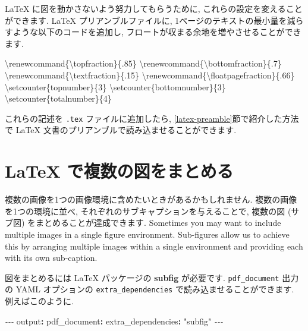 \documentclass[
  11pt,
]{bxjsreport}
\newenvironment{Shaded}{\begin{snugshade}}{\end{snugshade}}
\newcommand{\AttributeTok}[1]{\textcolor[rgb]{0.77,0.63,0.00}{#1}}
\newcommand{\ExtensionTok}[1]{#1}
\newcommand{\FunctionTok}[1]{\textcolor[rgb]{0.00,0.00,0.00}{#1}}
\newcommand{\KeywordTok}[1]{\textcolor[rgb]{0.13,0.29,0.53}{\textbf{#1}}}
\newcommand{\NormalTok}[1]{#1}
\newcommand{\PreprocessorTok}[1]{\textcolor[rgb]{0.56,0.35,0.01}{\textit{#1}}}
\newcommand{\StringTok}[1]{\textcolor[rgb]{0.31,0.60,0.02}{#1}}
\begin{document}
LaTeX に図を動かさないよう努力してもらうために, これらの設定を変えることができます. LaTeX プリアンブルファイルに, 1ページのテキストの最小量を減らすような以下のコードを追加し, フロートが収まる余地を増やさせることができます.

\begin{Shaded}
\begin{Highlighting}[]
\FunctionTok{\textbackslash{}renewcommand}\NormalTok{\{}\ExtensionTok{\textbackslash{}topfraction}\NormalTok{\}\{.85\}}
\FunctionTok{\textbackslash{}renewcommand}\NormalTok{\{}\ExtensionTok{\textbackslash{}bottomfraction}\NormalTok{\}\{.7\}}
\FunctionTok{\textbackslash{}renewcommand}\NormalTok{\{}\ExtensionTok{\textbackslash{}textfraction}\NormalTok{\}\{.15\}}
\FunctionTok{\textbackslash{}renewcommand}\NormalTok{\{}\ExtensionTok{\textbackslash{}floatpagefraction}\NormalTok{\}\{.66\}}
\FunctionTok{\textbackslash{}setcounter}\NormalTok{\{topnumber\}\{3\}}
\FunctionTok{\textbackslash{}setcounter}\NormalTok{\{bottomnumber\}\{3\}}
\FunctionTok{\textbackslash{}setcounter}\NormalTok{\{totalnumber\}\{4\}}
\end{Highlighting}
\end{Shaded}

これらの記述を \texttt{.tex} ファイルに追加したら, \ref{latex-preamble}節で紹介した方法で LaTeX 文書のプリアンブルで読み込ませることができます.

\hypertarget{latex-subfigure}{%
\section{LaTeX で複数の図をまとめる}\label{latex-subfigure}}

複数の画像を1つの画像環境に含めたいときがあるかもしれません. 複数の画像を1つの環境に並べ, それぞれのサブキャプションを与えることで, 複数の図 (サブ図) をまとめることが達成できます. Sometimes you may want to include multiple images in a single figure environment. Sub-figures allow us to achieve this by arranging multiple images within a single environment and providing each with its own sub-caption.

図をまとめるには LaTeX パッケージの \textbf{subfig} が必要です. \texttt{pdf\_document} 出力の YAML オプションの \texttt{extra\_dependencies} で読み込ませることができます. 例えばこのように.

\begin{Shaded}
\begin{Highlighting}[]
\PreprocessorTok{{-}{-}{-}}
\FunctionTok{output}\KeywordTok{:}
\AttributeTok{  }\FunctionTok{pdf\_document}\KeywordTok{:}
\AttributeTok{    }\FunctionTok{extra\_dependencies}\KeywordTok{:}\AttributeTok{ }\StringTok{"subfig"}
\PreprocessorTok{{-}{-}{-}}
\end{Highlighting}
\end{Shaded}
\end{document}

